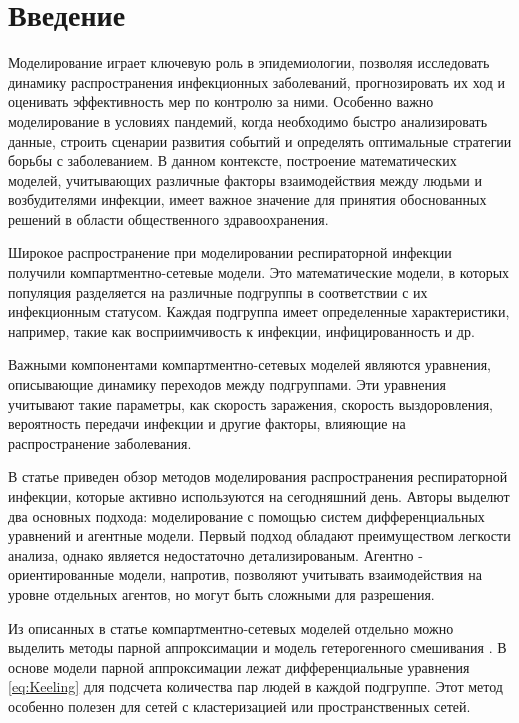 \documentclass[14pt,a4paper]{article}
\begin{document}


\newpage
\tableofcontents

\newpage
\section{Введение}

Моделирование играет ключевую роль в эпидемиологии, позволяя исследовать динамику распространения инфекционных заболеваний, прогнозировать их ход и оценивать эффективность мер по контролю за ними. Особенно важно моделирование в условиях пандемий, когда необходимо быстро анализировать данные, строить сценарии развития событий и определять оптимальные стратегии борьбы с заболеванием. В данном контексте, построение математических моделей, учитывающих различные факторы взаимодействия между людьми и возбудителями инфекции, имеет важное значение для принятия обоснованных решений в области общественного здравоохранения.

Широкое распространение при моделировании респираторной инфекции получили компартментно-сетевые модели. Это математические модели, в которых популяция разделяется на различные подгруппы в соответствии с их инфекционным статусом. Каждая подгруппа имеет определенные характеристики, например, такие как восприимчивость к инфекции, инфицированность и др.

Важными компонентами  компартментно-сетевых моделей являются уравнения, описывающие динамику переходов между подгруппами. Эти уравнения учитывают такие параметры, как скорость заражения, скорость выздоровления, вероятность передачи инфекции и другие факторы, влияющие на распространение заболевания.

В статье \cite{Bansal} приведен обзор методов моделирования распространения респираторной инфекции, которые активно используются на сегодняшний день.  Авторы выделют два основных подхода: моделирование с помощью систем дифференциальных уравнений и агентные модели.
Первый подход обладают преимуществом легкости анализа, однако является недостаточно детализированым. Агентно - ориентированные модели, напротив, позволяют учитывать взаимодействия на уровне отдельных агентов, но могут быть сложными для разрешения.

Из описанных в статье компартментно-сетевых моделей отдельно можно выделить методы парной аппроксимации \cite{Keeling} и модель гетерогенного смешивания \cite{Moreno}. В основе модели парной аппроксимации лежат дифференциальные уравнения \ref{eq:Keeling} для подсчета количества пар людей в каждой подгруппе. Этот метод особенно полезен для сетей с кластеризацией или пространственных сетей.
\end{document}
